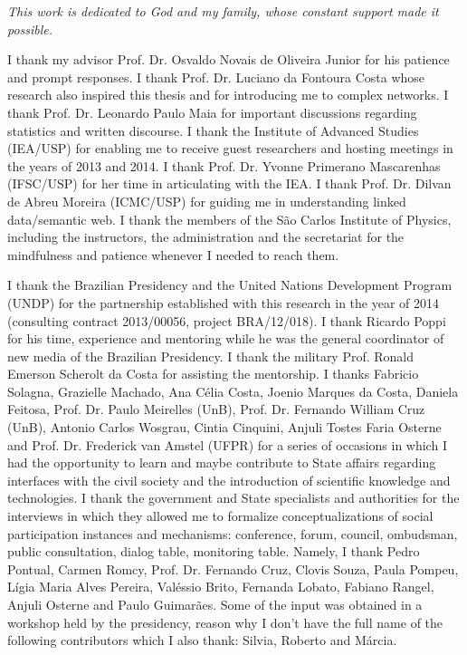\documentclass[
12pt,		%
openright,	%
twoside,  %
a4paper,			%
chapter=TITLE,		%
english,			%
french,				%
spanish,			%
brazil				%
]{USPSC}
\begin{document}
\begin{dedicatoria}
   \vspace*{\fill}
   \centering
   \noindent
   \textit{ This work is dedicated to God and my family, whose constant support made it possible.} \vspace*{\fill}
\end{dedicatoria}

\begin{agradecimentos}
I thank my advisor
Prof. Dr. Osvaldo Novais de Oliveira Junior
for his patience and prompt responses.	
I thank Prof. Dr. Luciano da Fontoura Costa
whose research also inspired this thesis
and for introducing me to complex networks.
I thank Prof. Dr. Leonardo Paulo Maia for important discussions regarding statistics and
written discourse.
I thank the Institute of Advanced Studies (IEA/USP)
for enabling me to receive guest researchers and hosting meetings in the years of 2013 and 2014.
I thank Prof. Dr. Yvonne Primerano Mascarenhas (IFSC/USP) for her time in articulating with the IEA.
I thank Prof. Dr. Dilvan de Abreu Moreira (ICMC/USP) for guiding me in understanding linked data/semantic web.
I thank the members of the São Carlos Institute of Physics,
including the instructors, the administration and the secretariat
for the mindfulness and patience whenever I needed to reach them.

	I thank the Brazilian Presidency and the United Nations Development Program (UNDP) for
the partnership established with this research in the year of 2014 (consulting contract 2013/00056, project BRA/12/018).
I thank Ricardo Poppi for his time, experience and mentoring while he was the general coordinator of new media of the Brazilian Presidency.
	I thank the military Prof. Ronald Emerson Scherolt da Costa for assisting the mentorship.
	I thanks Fabricio Solagna, Grazielle Machado, Ana Célia Costa,
	Joenio Marques da Costa, Daniela Feitosa, Prof. Dr. Paulo Meirelles (UnB), Prof. Dr. Fernando William Cruz (UnB), Antonio Carlos Wosgrau,
	Cintia Cinquini, Anjuli Tostes Faria Osterne and Prof. Dr. Frederick van Amstel (UFPR) for
a series of occasions in which I had the opportunity to learn and maybe contribute to State affairs
regarding interfaces with the civil society and the introduction of scientific knowledge and technologies.
I thank the government and State specialists and authorities for the interviews in which they
allowed me to formalize conceptualizations of social participation instances and mechanisms:
conference, forum, council, ombudsman, public consultation, dialog table, monitoring table.
Namely, I thank Pedro Pontual, Carmen Romcy, Prof. Dr. Fernando Cruz, Clovis Souza, Paula Pompeu, Lígia Maria Alves Pereira,
Valéssio Brito, Fernanda Lobato, Fabiano Rangel, Anjuli Osterne and Paulo Guimarães.
Some of the input was obtained in a workshop held by the presidency,
reason why I don't have the full name of the following contributors
which I also thank: Silvia, Roberto and Márcia.


\end{agradecimentos}
\end{document}
